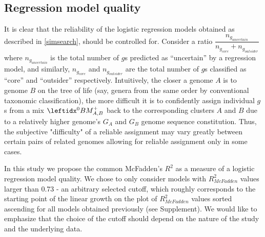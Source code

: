 \subsection{Regression model quality}
\label{regmodqual}
It is clear that the reliability of the logistic regression models obtained as
described in \ref{simsearch}, should be controlled for. Consider a ratio
$\dfrac{n_{g_{uncertain}}}{n_{g_{core}}+n_{g_{outsider}}}$ where
$n_{g_{uncertain}}$ is the total number of $g$s predicted as ``uncertain'' by a
regression model, and similarly, $n_{g_{core}}$ and $n_{g_{outsider}}$ are the
total number of $g$s classified as ``core'' and ``outsider'' respectively.
Intuitively, the closer a genome $A$ is to genome $B$ on the tree of life (say,
genera from the same order by conventional taxonomic classification), the more
difficult it is to confidently assign individual $g$s from a mix $\bmzpab$ back
to the corresponding clusters $A$ and $B$ due to a relatively higher genome's
$G_A$ and $G_B$ genome sequence constitution. Thus, the subjective "difficulty"
of a reliable assignment may vary greatly between certain pairs of related
genomes allowing for reliable assignment only in some cases.

In this study we propose the common McFadden's $R^2$ \cite{McFadden1974} as a
measure of a logistic regression model quality. We chose to only consider
models with $R_{McFadden}^2$ values larger than 0.73 - an arbitrary selected
cutoff, which roughly corresponds to the starting point of the linear growth on
the plot of $R_{McFadden}^2$ values sorted ascending for all models obtained
previously (see Supplement). We would like to emphasize that the choice of the
cutoff should depend on the nature of the study and the underlying data.
